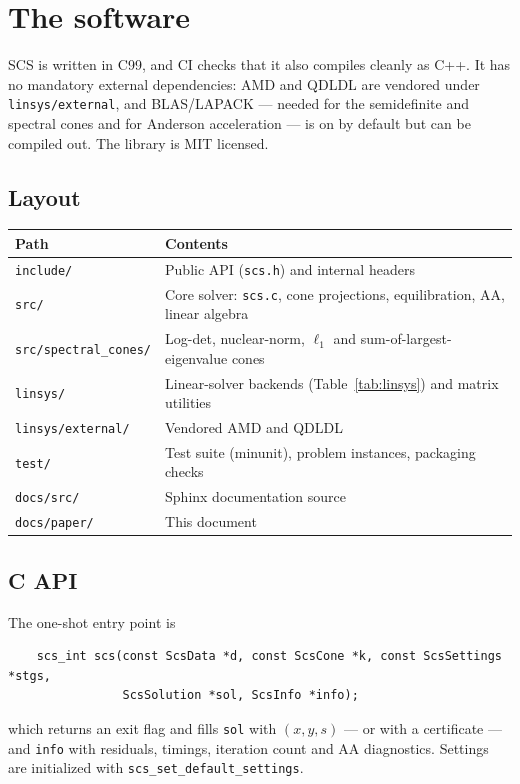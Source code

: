 \documentclass[11pt,a4paper]{article}
\theoremstyle{plain}
\begin{document}
\section{The software}

SCS is written in C99, and CI checks that it also compiles cleanly as
C++. It has no mandatory external dependencies: AMD and QDLDL are vendored
under \texttt{linsys/external}, and BLAS/LAPACK --- needed for the semidefinite
and spectral cones and for Anderson acceleration --- is on by default but can
be compiled out. The library is MIT licensed.

\subsection{Layout}

\begin{center}
\small
\begin{tabular}{@{}ll@{}}
\toprule
Path & Contents \\
\midrule
\texttt{include/}    & Public API (\texttt{scs.h}) and internal headers \\
\texttt{src/}        & Core solver: \texttt{scs.c}, cone projections, equilibration, AA, linear algebra \\
\texttt{src/spectral\_cones/} & Log-det, nuclear-norm, $\ell_1$ and sum-of-largest-eigenvalue cones \\
\texttt{linsys/}     & Linear-solver backends (Table~\ref{tab:linsys}) and matrix utilities \\
\texttt{linsys/external/} & Vendored AMD and QDLDL \\
\texttt{test/}       & Test suite (minunit), problem instances, packaging checks \\
\texttt{docs/src/}   & Sphinx documentation source \\
\texttt{docs/paper/} & This document \\
\bottomrule
\end{tabular}
\end{center}

\subsection{C API}

The one-shot entry point is
\begin{verbatim}
    scs_int scs(const ScsData *d, const ScsCone *k, const ScsSettings *stgs,
                ScsSolution *sol, ScsInfo *info);
\end{verbatim}
which returns an exit flag and fills \texttt{sol} with $(x, y, s)$ --- or with
a certificate --- and \texttt{info} with residuals, timings, iteration count
and AA diagnostics. Settings are initialized with
\texttt{scs\_set\_default\_settings}.
\end{document}
